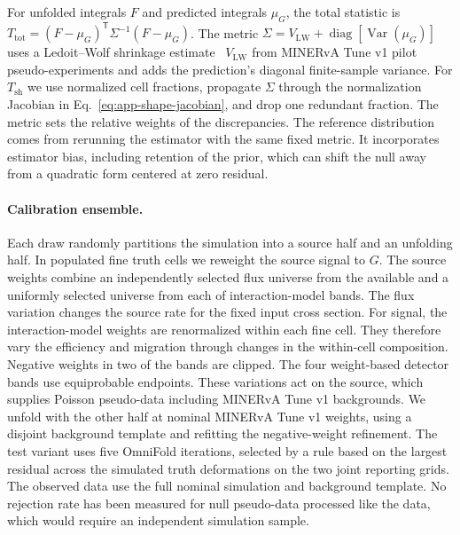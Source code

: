 For unfolded integrals $F$ and predicted integrals $\mu_G$, the total statistic is $T_{\mathrm{tot}}=(F-\mu_G)^{\mathsf T}\Sigma^{-1}(F-\mu_G)$. The metric $\Sigma=V_{\mathrm{LW}}+\operatorname{diag}[\operatorname{Var}(\mu_G)]$ uses a Ledoit--Wolf shrinkage estimate~\cite{LedoitWolf:2004} $V_{\mathrm{LW}}$ from \jtVn{} MINERvA Tune v1 pilot pseudo-experiments and adds the prediction's diagonal finite-sample variance. For $T_{\mathrm{sh}}$ we use normalized cell fractions, propagate $\Sigma$ through the normalization Jacobian in Eq.~\eqref{eq:app-shape-jacobian}, and drop one redundant fraction. The metric sets the relative weights of the discrepancies. The reference distribution comes from rerunning the estimator with the same fixed metric. It incorporates estimator bias, including retention of the prior, which can shift the null away from a quadratic form centered at zero residual.

\paragraph{Calibration ensemble.} Each draw randomly partitions the simulation into a source half and an unfolding half. In populated fine truth cells we reweight the source signal to $G$. The source weights combine an independently selected flux universe from the \jtFluxUniverses{} available and a uniformly selected universe from each of \jtModelBands{} interaction-model bands. The flux variation changes the source rate for the fixed input cross section. For signal, the interaction-model weights are renormalized within each fine cell. They therefore vary the efficiency and migration through changes in the within-cell composition. Negative weights in two of the bands are clipped. The four weight-based detector bands use equiprobable endpoints. These variations act on the source, which supplies Poisson pseudo-data including MINERvA Tune v1 backgrounds. We unfold with the other half at nominal MINERvA Tune v1 weights, using a disjoint background template and refitting the negative-weight refinement. The test variant uses five OmniFold iterations, selected by a rule based on the largest residual across the simulated truth deformations on the two joint reporting grids. The observed data use the full nominal simulation and background template. No rejection rate has been measured for null pseudo-data processed like the data, which would require an independent simulation sample.

